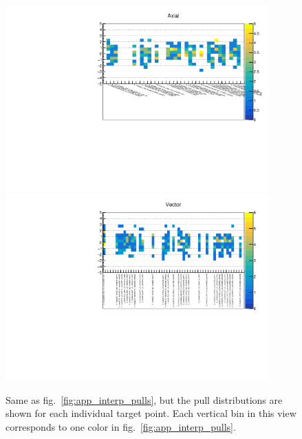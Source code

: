  \begin{figure}[htbp]
   \begin{center}
	\includegraphics[width=0.9\textwidth]{figures/interpolation_appendix/Axial_pulls_per_point.pdf}
	\includegraphics[width=0.9\textwidth]{figures/interpolation_appendix/Vector_pulls_per_point.pdf}
     \caption{Same as fig.~\ref{fig:app_interp_pulls}, but the pull distributions are shown for each individual target point. Each vertical bin in this view corresponds to one color in fig.~\ref{fig:app_interp_pulls}.}
     \label{fig:app_interp_pulls_per_point}
   \end{center}
 \end{figure}

